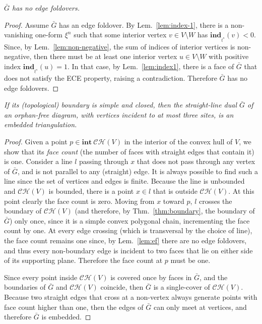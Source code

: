 \documentclass[11pt]{article}
\begin{document}
\emph{
$\bar{G}$ has no edge foldovers. }
\begin{proof}
Assume $\bar{G}$ has an edge foldover. 
By Lem.~\ref{lem:index-1}, there is a non-vanishing one-form
$\xi^n$ such that some interior vertex $v\in V\setminus W$ has $\mathbf{ind}_{_{\xi^n}}(v)<0$. 
Since, by Lem.~\ref{lem:non-negative}, the sum of indices of interior vertices is
non-negative,
then there must be
at least one interior vertex $u\in V\setminus W$ with positive index
$\mathbf{ind}_{_{\xi^n}}(u)=1$. In that case, by Lem.~\ref{lem:index1}, there is a face of $\bar{G}$ that does not satisfy the
ECE property, raising a contradiction. 
Therefore $\bar{G}$ has no edge foldovers. 
\end{proof}







\emph{
If its (topological) boundary is simple and closed, then the straight-line dual $\bar{G}$ of an orphan-free diagram, with vertices incident to at most three sites, is an embedded triangulation. 
}
\begin{proof}


Given a point $p\in\mathbf{int\ }{\mathcal{CH}(V)}$ in
the interior of the convex hull of $V$, we show that its \emph{face count}
(the number of faces with straight edges that contain it) is one. 
Consider a line $l$ passing through $x$ that does not pass through any vertex of
$\bar{G}$, and is not parallel to any (straight) edge. 
It is always possible to find such a line since the set of vertices and edges is finite. 
Because the line is unbounded and $\mathcal{CH}(V)$ is bounded, there is a
point $x\in l$ that is outside $\mathcal{CH}(V)$. At this point clearly the
face count is zero. 
Moving from $x$ toward $p$, $l$ crosses the boundary of $\mathcal{CH}(V)$
(and therefore, by Thm.~\ref{thm:boundary}, the boundary of $\bar{G}$) 
only once, since it is a simple convex polygonal chain, incrementing the face
count by one. At every edge crossing (which is transversal by the choice of
line), the face count remains one since, by Lem.~\ref{lem:ef} there are no
edge foldovers, and thus every non-boundary edge is incident to two faces
that lie on either side of its supporting plane. Therefore the face count at
$p$ must be one. 


Since every point inside $\mathcal{CH}(V)$ is covered once by faces in
$\bar{G}$,
and the boundaries of $\bar{G}$ and $\mathcal{CH}(V)$ coincide, then
$\bar{G}$ is a single-cover
of $\mathcal{CH}(V)$. 
Because two straight edges that cross at a non-vertex always generate points with
face count higher than one, then the edges of $\bar{G}$ can only meet at vertices, and
therefore $\bar{G}$ is embedded. 
\end{proof}
\end{document}
